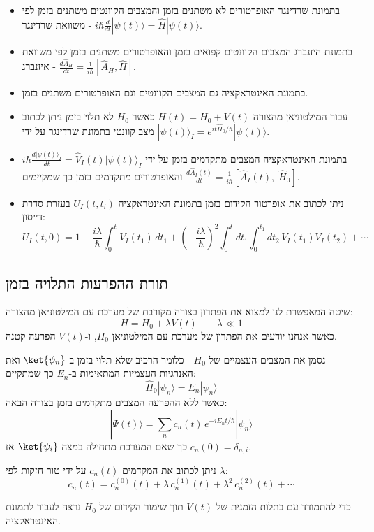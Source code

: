 \documentclass{tstextbook}
\begin{document}
\begin{summary}
  \begin{itemize}
    \item בתמונת שרדינגר האופרטורים לא משתנים בזמן והמצבים הקוונטים משתנים בזמן לפי משוואת שרדינגר - \(i\hbar{\frac{d}{d t}}|\psi(t)\rangle={\hat{H}}|\psi(t)\rangle\).
    \item בתמונת היזנברג המצבים הקוונטים קפואים בזמן והאופרטורים משתנים בזמן לפי משוואת איזנברג - \(\frac{d\hat{A}_{H}}{d t}=\frac{1}{i\hbar}\left[\hat{A}_{H},\hat{H}\right]\).
    \item בתמונת האינטראקציה גם המצבים הקוונטים וגם האופרטורים משתנים בזמן.
    \item עבור המילטוניאן מהצורה \(H(t)=H_{0}+V(t)\) כאשר \(H_{0}\) לא תלוי בזמן ניתן לכתוב מצב קוונטי בתמונת שרדינגר על ידי \(|\psi(t)\rangle_{I}=e^{i t\hat{H}_{0}/\hbar}|\psi(t)\rangle\).
    \item בתמונת האינטראקציה המצבים מתקדמים בזמן על ידי \(i\hbar\frac{d|\psi(t)\rangle_{I}}{d t}=\hat{V}_{I}(t)|\psi(t)\rangle_{I}\) והאופרטורים מתקדמים בזמן כך שמקיימים \(\frac{d\hat{A}_{I}(t)}{d t}=\frac{1}{i\hbar}\left[\hat{A}_{I}(t),\;\hat{H}_{0}\right]\).
    \item ניתן לכתוב את אופרטור הקידום בזמן בתמונת האינטראקציה \(U_{I}(t,t_{i})\) בעזרת סדרת דייסון:
$$U_{I}(t,0)=1-\frac{i\lambda}{\hbar}\int_{0}^{t}V_{I}(t_{1})\,d t_{1}+\left(-\frac{i\lambda}{\hbar}\right)^{2}\int_{0}^{t}d t_{1}\int_{0}^{t_{1}}d t_{2}\,V_{I}(t_{1})V_{I}(t_{2})+\cdots$$
  \end{itemize}
\end{summary}
\subsection{תורת ההפרעות התלויה בזמן}

\begin{definition}
שיטה המאפשרת לנו למצוא את הפתרון בצורה מקורבת של מערכת עם המילטוניאן מהצורה:
$$H= H_{0}+ \lambda V(t)\qquad \lambda\ll 1$$
כאשר אנחנו יודעים את הפתרון של מערכת עם המילטוניאן \(H_{0}\), ו-\(V(t)\) הפרעה קטנה.

\end{definition}
\begin{symbolize}
נסמן את המצבים העצמיים של \(H_{0}\) - כלומר הרכיב שלא תלוי בזמן ב-\(\ket{\psi_{n}}\) ואת האנרגיות העצמיות המתאימות ב-\(E_{n}\) כך שמתקיים:
$$\hat{H}_{0}|\psi_{n}\rangle=E_{n}|\psi_{n}\rangle$$
כאשר ללא ההפרעה המצבים מתקדמים בזמן בצורה הבאה:
$$|\Psi(t)\rangle=\sum_{n}c_{n}(t)\,e^{-i E_{n}t/\hbar}|\psi_{n}\rangle$$
כך שאם המערכת מתחילה במצה \(\ket{\psi_{i}}\) אז \(c_{n}(0)=\delta_{n,i}\).

\end{symbolize}
\begin{symbolize}
ניתן לכתוב את המקדמים \(c_{n}(t)\) על ידי טור חזקות לפי \(\lambda\):
$$c_{n}(t)=c_{n}^{(0)}(t)+\lambda\,c_{n}^{(1)}(t)+\lambda^{2}\,c_{n}^{(2)}(t)+\cdots$$

\end{symbolize}
כדי להתמודד עם בתלות הזמנית של \(V(t)\) תוך שימור הקידום של \(H_{0}\) נרצה לעבור לתמונת האינטראקציה.
\end{document}
